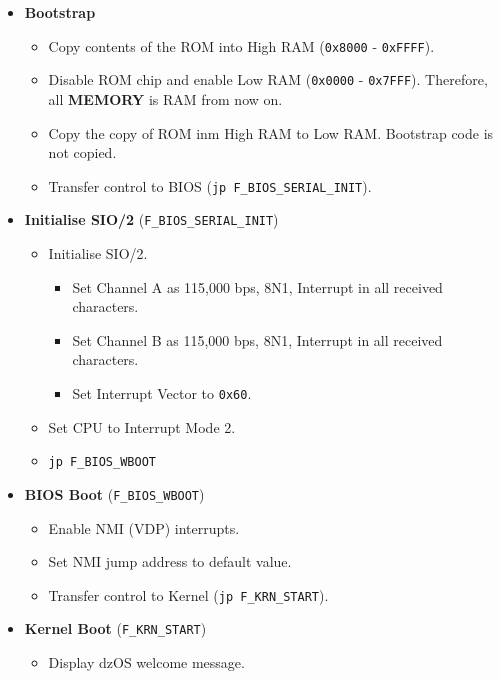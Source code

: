     \begin{itemize}
        \item \textbf{Bootstrap}
        \begin{itemize}
            \item Copy contents of the ROM into High RAM (\texttt{0x8000} - \texttt{0xFFFF}).
            \item Disable ROM chip and enable Low RAM (\texttt{0x0000} - \texttt{0x7FFF}).
            Therefore, all \textbf{MEMORY} is RAM from now on.
            \item Copy the copy of ROM inm High RAM to Low RAM. Bootstrap code is not copied.
            \item Transfer control to BIOS (\texttt{jp F\_BIOS\_SERIAL\_INIT}).
        \end{itemize}
        \item \textbf{Initialise SIO/2} (\texttt{F\_BIOS\_SERIAL\_INIT})
        \begin{itemize}
            \item Initialise SIO/2.
            \begin{itemize}
                \item Set Channel A as 115,000 bps, 8N1, Interrupt in all 
                received characters.
                \item Set Channel B as 115,000 bps, 8N1, Interrupt in all 
                received characters.
                \item Set Interrupt Vector to \texttt{0x60}.
            \end{itemize}
            \item Set CPU to Interrupt Mode 2.
            \item \texttt{jp F\_BIOS\_WBOOT}
        \end{itemize}
        \item \textbf{BIOS Boot} (\texttt{F\_BIOS\_WBOOT})
        \begin{itemize}
            \item Enable NMI (VDP) interrupts.
            \item Set NMI jump address to default value.
            \item Transfer control to Kernel (\texttt{jp F\_KRN\_START}).
        \end{itemize}
        \item \textbf{Kernel Boot} (\texttt{F\_KRN\_START})
        \begin{itemize}
            \item Display dzOS welcome message.

\end{itemize}
\end{itemize}
